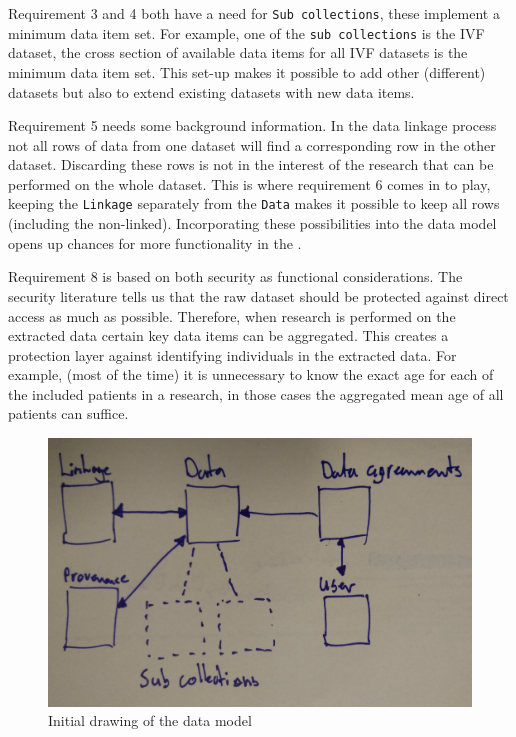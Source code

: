 Requirement 3 and 4 both have a need for {\tt Sub collections}, these implement a minimum data item set.
For example, one of the {\tt sub collections} is the IVF dataset, the cross section of available data items for all IVF datasets is the minimum data item set.
This set-up makes it possible to add other (different) datasets but also to extend existing datasets with new data items.

Requirement 5 needs some background information.
In the data linkage process not all rows of data from one dataset will find a corresponding row in the other dataset.
Discarding these rows is not in the interest of the research that can be performed on the whole dataset.
This is where requirement 6 comes in to play, keeping the {\tt Linkage} separately from the {\tt Data} makes it possible to keep all rows (including the non-linked).
Incorporating these possibilities into the data model opens up chances for more functionality in the \ivfsystem{}.

Requirement 8 is based on both security as functional considerations.
The security literature tells us that the raw dataset should be protected against direct access as much as possible.
Therefore, when research is performed on the extracted data certain key data items can be aggregated.
This creates a protection layer against identifying individuals in the extracted data.
For example, (most of the time) it is unnecessary to know the exact age for each of the included patients in a research, in those cases the aggregated mean age of all patients can suffice.

\begin{figure}[b]
	\centering
	\includegraphics[width=1.0\linewidth]{images/small-structure-v2}
	\caption{Initial drawing of the data model} %
	\label{fig:model-drawing}
\end{figure}

